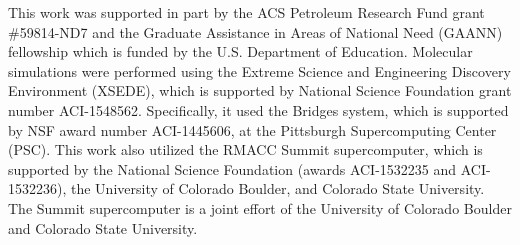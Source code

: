 \documentclass[journal=jpcbfk,manuscript=article]{achemso}
\begin{document}
  This work was supported in part by the ACS Petroleum Research Fund
  grant \#59814-ND7 and the Graduate Assistance in Areas of National Need (GAANN) 
  fellowship which is funded by the U.S. Department of Education. 
  Molecular simulations were performed using the Extreme Science and
  Engineering Discovery Environment (XSEDE), which is supported by National
  Science Foundation grant number ACI-1548562. Specifically, it used the Bridges
  system, which is supported by NSF award number ACI-1445606, at the Pittsburgh
  Supercomputing Center (PSC). This work also utilized the RMACC Summit supercomputer,
  which is supported by the National Science Foundation (awards ACI-1532235 and
  ACI-1532236), the University of Colorado Boulder, and Colorado State
  University. The Summit supercomputer is a joint effort of the University of
  Colorado Boulder and Colorado State University.

  \clearpage

  
  


\end{document}
